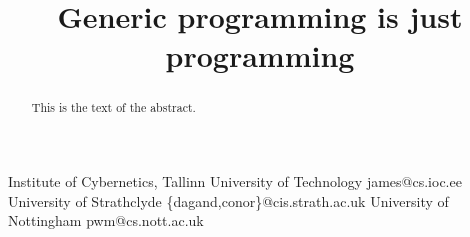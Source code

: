 \documentclass[preprint, authoryear]{sigplanconf}
\begin{document}






\title{Generic programming is just programming}


           {Institute of Cybernetics, Tallinn University of Technology}
           {james@cs.ioc.ee}
           {University of Strathclyde}
           {\{dagand,conor\}@cis.strath.ac.uk}
           {University of Nottingham}
           {pwm@cs.nott.ac.uk}


\maketitle




\begin{abstract}
This is the text of the abstract.
\end{abstract}






\end{document}
